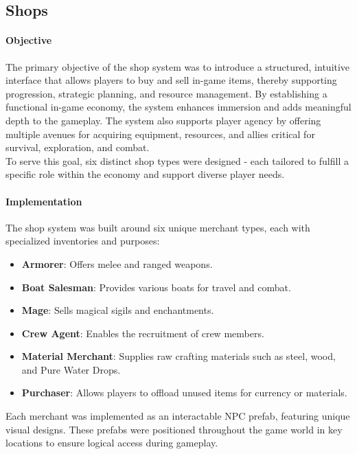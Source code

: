 \documentclass{article}
\begin{document}
\newpage
\subsection{Shops}
\paragraph{Objective}\hfill

The primary objective of the shop system was to introduce a structured, intuitive interface that allows players to buy and sell in-game items, thereby supporting progression, strategic planning, and resource management. By establishing a functional in-game economy, the system enhances immersion and adds meaningful depth to the gameplay. The system also supports player agency by offering multiple avenues for acquiring equipment, resources, and allies critical for survival, exploration, and combat.\\

To serve this goal, six distinct shop types were designed - each tailored to fulfill a specific role within the economy and support diverse player needs.

\paragraph{Implementation}\hfill

The shop system was built around six unique merchant types, each with specialized inventories and purposes:
\begin{itemize}
    \item \textbf{Armorer}: Offers melee and ranged weapons.
    \item \textbf{Boat Salesman}: Provides various boats for travel and combat.
    \item \textbf{Mage}: Sells magical sigils and enchantments.
    \item \textbf{Crew Agent}: Enables the recruitment of crew members.
    \item \textbf{Material Merchant}: Supplies raw crafting materials such as steel, wood, and Pure Water Drops.
    \item \textbf{Purchaser}: Allows players to offload unused items for currency or materials.
\end{itemize}

Each merchant was implemented as an interactable NPC prefab, featuring unique visual designs. These prefabs were positioned throughout the game world in key locations to ensure logical access during gameplay.\\
\end{document}

